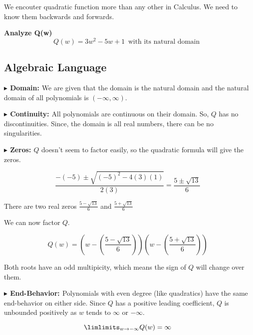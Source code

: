\documentclass{ximera}
\author{Lee Wayand}
\begin{document}
\begin{exercise}



We encouter quadratic function more than any other in Calculus.  We need to know them backwards and forwards. 


\textbf{Analyze Q(w)} \\

\[
Q(w) = 3 w^2 -5 w + 1 \, \text { with its natural domain } 
\]






\subsection{Algebraic Language}



\textbf{\textcolor{blue!55!black}{$\blacktriangleright$ Domain: }} We are given that the domain is the natural domain and the natural domain of all polynomials is $(-\infty, \infty)$.


\textbf{\textcolor{blue!55!black}{$\blacktriangleright$ Continuity: }}  All polynomials are continuous on their domain.  So, $Q$ has no discontinuities.  Since, the domain is all real numbers, there can be no singularities.



\textbf{\textcolor{blue!55!black}{$\blacktriangleright$ Zeros: }}  $Q$ doesn't seem to factor easily, so the quadratic formula will give the zeros.


\[
\frac{-(-5) \pm \sqrt{(-5)^2 - 4 (3) (1)}}{2(3)} = \frac{5 \pm \sqrt{13}}{6}
\]


There are two real zeros $\frac{5 - \sqrt{13}}{6}$ and $\frac{5 + \sqrt{13}}{6}$



We can now factor $Q$.

\[
Q(w) = \left(w - \left( \frac{5 - \sqrt{13}}{6} \right) \right) \left(w - \left( \frac{5 + \sqrt{13}}{6} \right) \right)
\]

Both roots have an odd multipicity, which means the sign of $Q$ will change over them.




\textbf{\textcolor{blue!55!black}{$\blacktriangleright$ End-Behavior: }} Polynomials with even degree (like quadratics) have the same end-behavior on either side.  Since $Q$ has a positive leading coefficient, $Q$ is unbounded positively as $w$ tends to $\infty$ or $-\infty$.

\[
\limlimits_{w \to -\infty} Q(w) = \infty
\]



\end{exercise}
\end{document}
